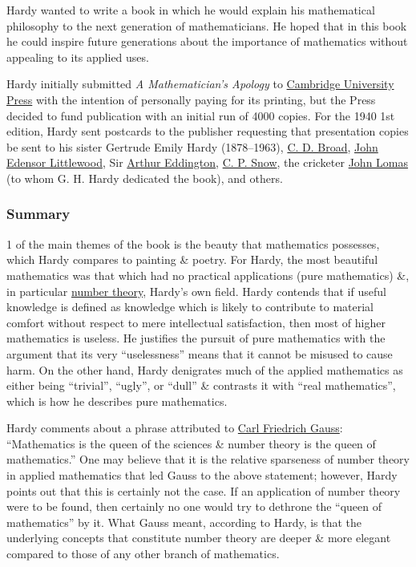 \documentclass{article}
\begin{document}
{\sc Hardy} wanted to write a book in which he would explain his mathematical philosophy to the next generation of mathematicians. He hoped that in this book he could inspire future generations about the importance of mathematics without appealing to its applied uses.

{\sc Hardy} initially submitted {\it A Mathematician's Apology} to \href{https://en.wikipedia.org/wiki/Cambridge_University_Press}{Cambridge University Press} with the intention of personally paying for its printing, but the Press decided to fund publication with an initial run of 4000 copies. For the 1940 1st edition, {\sc Hardy} sent postcards to the publisher requesting that presentation copies be sent to his sister {\sc Gertrude Emily Hardy} (1878--1963), \href{https://en.wikipedia.org/wiki/C._D._Broad}{\sc C. D. Broad}, \href{https://en.wikipedia.org/wiki/John_Edensor_Littlewood}{\sc John Edensor Littlewood}, Sir \href{https://en.wikipedia.org/wiki/Arthur_Eddington}{\sc Arthur Eddington}, \href{https://en.wikipedia.org/wiki/C._P._Snow}{C. P. Snow}, the cricketer \href{https://en.wikipedia.org/wiki/John_Lomas_(cricketer)}{\sc John Lomas} (to whom {\sc G. H. Hardy} dedicated the book), and others.

\subsubsection{Summary}
1 of the main themes of the book is the beauty that mathematics possesses, which {\sc Hardy} compares to painting \& poetry. For {\sc Hardy}, the most beautiful mathematics was that which had no practical applications (pure mathematics) \&, in particular \href{https://en.wikipedia.org/wiki/Number_theory}{number theory}, {\sc Hardy}'s own field. {\sc Hardy} contends that if useful knowledge is defined as knowledge which is likely to contribute to material comfort without respect to mere intellectual satisfaction, then most of higher mathematics is useless. He justifies the pursuit of pure mathematics with the argument that its very ``uselessness'' means that it cannot be misused to cause harm. On the other hand, {\sc Hardy} denigrates much of the applied mathematics as either being ``trivial'', ``ugly'', or ``dull'' \& contrasts it with ``real mathematics'', which is how he describes pure mathematics.

{\sc Hardy} comments about a phrase attributed to \href{https://en.wikipedia.org/wiki/Carl_Friedrich_Gauss}{\sc Carl Friedrich Gauss}: ``Mathematics is the queen of the sciences \& number theory is the queen of mathematics.'' One may believe that it is the relative sparseness of number theory in applied mathematics that led {\sc Gauss} to the above statement; however, {\sc Hardy} points out that this is certainly not the case. If an application of number theory were to be found, then certainly no one would try to dethrone the ``queen of mathematics'' by it. What {\sc Gauss} meant, according to {\sc Hardy}, is that the underlying concepts that constitute number theory are deeper \& more elegant compared to those of any other branch of mathematics.
\end{document}
